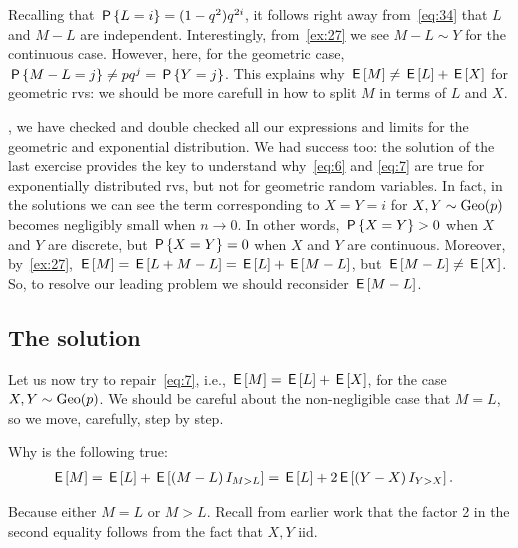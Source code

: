 Recalling that $\P{L=i} = (1-q^2)q^{2i}$, it follows right away from~\cref{eq:34} that $L$  and $M-L$ are independent.
Interestingly, from~\cref{ex:27} we see $M-L\sim Y$ for the continuous case. However, here, for the geometric case, $\P{M-L=j} \neq pq^{j} = \P{Y=j}$.  This explains why $\E M \neq \E L + \E X$ for geometric rvs: we should be more carefull in how to split $M$ in terms of $L$ and $X$.



, we have checked and double checked all our expressions and limits for the geometric and exponential distribution.
We had success too: the solution of the last exercise provides the key to understand why~\eqref{eq:6} and \eqref{eq:7} are true for exponentially distributed rvs, but not for geometric random variables.
In fact, in the solutions we can see the term corresponding to $X=Y=i$ for $X,Y\sim \Geo{p}$ becomes negligibly small when $n\to 0$.
In other words, $\P{X=Y}>0$  when $X$ and $Y$ are discrete, but $\P{X=Y}=0$ when  $X$ and $Y$ are continuous.
Moreover, by~\cref{ex:27}, $\E M = \E{L + M-L} = \E L + \E{M-L}$, but $\E{M-L} \neq \E X$. So, to resolve our leading problem we should reconsider $\E{M-L}$.


\subsection{The solution}
\label{sec:solution}


Let us now try to repair~\cref{eq:7}, i.e., $\E M = \E L + \E X$,  for the case $X,Y\sim\Geo{p}$. We should be careful about the non-negligible case that $M=L$, so we move, carefully, step by step.

\begin{exercise}
Why is the following true:
\begin{align}
  \label{eq:40}
\E M &= \E L + \E{(M-L) \1{M>L}}  = \E L + 2\E{(Y-X) \1{Y>X}}.
\end{align}
\begin{solution}
Because either $M=L$ or $M>L$. Recall from earlier work that the factor 2 in the second equality follows from the fact that $X,Y$ iid.
\end{solution}
\end{exercise}


